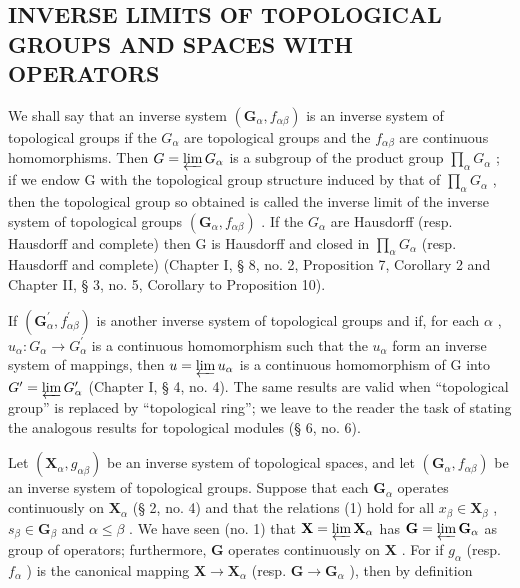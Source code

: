\subsection{INVERSE LIMITS OF TOPOLOGICAL GROUPS AND SPACES WITH OPERATORS}

We shall say that an inverse system \((\mathbf{G}_{\alpha}, f_{\alpha\beta})\) is an inverse system of topological groups if the \(G_{\alpha}\) are topological groups and the \(f_{\alpha\beta}\) are continuous homomorphisms. Then \(G = \varprojlim G_{\alpha}\) is a subgroup of the product group \(\prod_{\alpha} G_{\alpha}\) ; if we endow G with the topological group structure induced by that of \(\prod_{\alpha} G_{\alpha}\) , then the topological group so obtained is called the inverse limit of the inverse system of topological groups \((\mathbf{G}_{\alpha}, f_{\alpha\beta})\) . If the \(G_{\alpha}\) are Hausdorff (resp. Hausdorff and complete) then G is Hausdorff and closed in \(\prod_{\alpha} G_{\alpha}\) (resp. Hausdorff and complete) (Chapter I, § 8, no. 2, Proposition 7, Corollary 2 and Chapter II, § 3, no. 5, Corollary to Proposition 10).

If \((\mathbf{G}_{\alpha}^{\prime}, f_{\alpha\beta}^{\prime})\) is another inverse system of topological groups and if, for each \(\alpha\) , \(u_{\alpha}: G_{\alpha} \to G_{\alpha}^{\prime}\) is a continuous homomorphism such that the \(u_{\alpha}\) form an inverse system of mappings, then \(u = \varprojlim u_{\alpha}\) is a continuous homomorphism of G into \(G^{\prime} = \varprojlim G_{\alpha}^{\prime}\) (Chapter I, § 4, no. 4). The same results are valid when ``topological group'' is replaced by ``topological ring''; we leave to the reader the task of stating the analogous results for topological modules (§ 6, no. 6).

Let \((\mathbf{X}_{\alpha}, g_{\alpha \beta})\) be an inverse system of topological spaces, and let \((\mathbf{G}_{\alpha}, f_{\alpha \beta})\) be an inverse system of topological groups. Suppose that each \(\mathbf{G}_{\alpha}\) operates continuously on \(\mathbf{X}_{\alpha}\) (§ 2, no. 4) and that the relations (1) hold for all \(x_{\beta} \in \mathbf{X}_{\beta}\) , \(s_{\beta} \in \mathbf{G}_{\beta}\) and \(\alpha \leqslant \beta\) . We have seen (no. 1) that \(\mathbf{X} = \varprojlim \mathbf{X}_{\alpha}\) has \(\mathbf{G} = \varprojlim \mathbf{G}_{\alpha}\) as group of operators; furthermore, \(\mathbf{G}\) operates continuously on \(\mathbf{X}\) . For if \(g_{\alpha}\) (resp. \(f_{\alpha}\) ) is the canonical mapping \(\mathbf{X} \to \mathbf{X}_{\alpha}\) (resp. \(\mathbf{G} \to \mathbf{G}_{\alpha}\) ), then by definition

